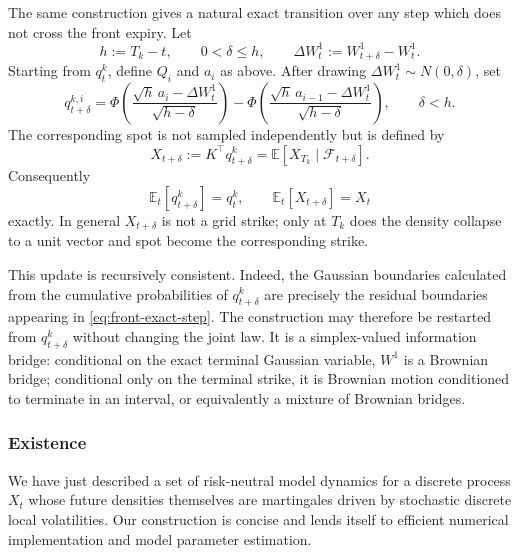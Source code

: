 \documentclass[11pt]{article}
\theoremstyle{plain}
\theoremstyle{definition}
\theoremstyle{remark}
\begin{document}
  The same construction gives a natural exact transition over any step which
  does not cross the front expiry. Let
  \[
    h:=T_k-t,
    \qquad 0<\delta\leq h,
    \qquad \Delta W_t^1:=W_{t+\delta}^1-W_t^1.
  \]
  Starting from $q_t^k$, define $Q_i$ and $a_i$ as above. After drawing
  $\Delta W_t^1\sim N(0,\delta)$, set
  \begin{equation}
    \label{eq:front-exact-step}
    q_{t+\delta}^{k,i}
      =\Phi\!\left(
          \frac{\sqrt h\,a_i-\Delta W_t^1}{\sqrt{h-\delta}}
        \right)
       -\Phi\!\left(
          \frac{\sqrt h\,a_{i-1}-\Delta W_t^1}{\sqrt{h-\delta}}
        \right),
    \qquad \delta<h.
  \end{equation}
  The corresponding spot is not sampled independently but is defined by
  \begin{equation}
    \label{eq:spot-exact-step}
    X_{t+\delta}:=K^\top q_{t+\delta}^k
      =\mathbb E\!\left[X_{T_k}\mid\mathcal F_{t+\delta}\right].
  \end{equation}
  Consequently
  \[
    \mathbb E_t[q_{t+\delta}^k]=q_t^k,
    \qquad
    \mathbb E_t[X_{t+\delta}]=X_t
  \]
  exactly. In general $X_{t+\delta}$ is not a grid strike; only at $T_k$ does
  the density collapse to a unit vector and spot become the corresponding
  strike.

  This update is recursively consistent. Indeed, the Gaussian boundaries
  calculated from the cumulative probabilities of $q_{t+\delta}^k$ are
  precisely the residual boundaries appearing in
  \eqref{eq:front-exact-step}. The construction may therefore be restarted
  from $q_{t+\delta}^k$ without changing the joint law. It is a
  simplex-valued information bridge: conditional on the exact terminal
  Gaussian variable, $W^1$ is a Brownian bridge; conditional only on the
  terminal strike, it is Brownian motion conditioned to terminate in an
  interval, or equivalently a mixture of Brownian bridges.

\subsubsection{Existence}
\label{sec:existence}
We have just described a set of risk-neutral model dynamics for a discrete process $X_t$ whose future densities themselves are martingales driven by stochastic discrete local volatilities. Our construction is concise and lends itself to efficient numerical implementation and model parameter estimation. 
\end{document}
